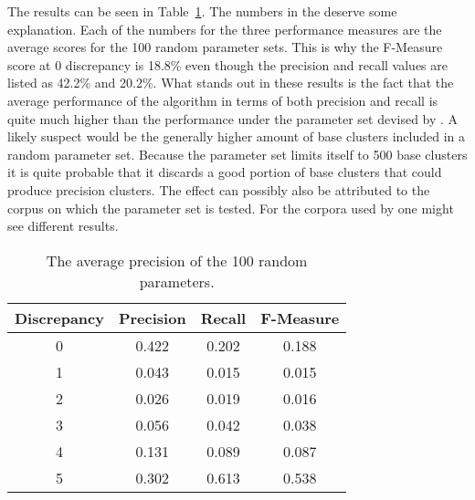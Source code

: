 The results can be seen in Table~\ref{tab:randomparamsresult}. The numbers in the deserve some explanation. Each of the numbers for the three performance measures are the average scores for the 100 random parameter sets. This is why the F-Measure score at 0 discrepancy is 18.8\% even though the precision and recall values are listed as 42.2\% and 20.2\%. What stands out in these results is the fact that the average performance of the algorithm in terms of both precision and recall is quite much higher than the performance under the parameter set devised by \cite{Oren1998}. A likely suspect would be the generally higher amount of base clusters included in a random parameter set. Because the \citeauthor{Oren1998} parameter set limits itself to 500 base clusters it is quite probable that it discards a good portion of base clusters that could produce precision clusters. The effect can possibly also be attributed to the corpus on which the parameter set is tested. For the corpora used by \cite{Oren1998} one might see different results.

\begin{table}[H]
\begin{center}
\begin{tabular}{|c|ccc|}
\hline
Discrepancy & Precision & Recall & F-Measure\\ 
\hline
0 & 0.422 & 0.202 & 0.188\\
1 & 0.043 & 0.015 & 0.015\\
2 & 0.026 & 0.019 & 0.016\\
3 & 0.056 & 0.042 & 0.038\\
4 & 0.131 & 0.089 & 0.087\\
5 & 0.302 & 0.613 & 0.538\\
\hline
\end{tabular}
\end{center}
\caption{The average precision of the 100 random parameters.}
\label{tab:randomparamsresult}
\end{table}



